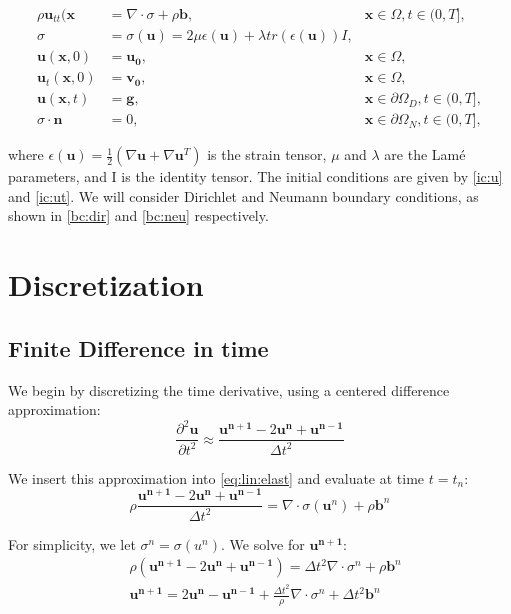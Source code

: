 \documentclass[twoside]{article}
\newcommand{\dutt}{\frac{\partial^2 \mathbf{u}}{\partial t^2}}
\newcommand{\dtt}{\Delta t^2}
\newcommand{\unp}{\mathbf{u^{n+1}}}
\newcommand{\un}{\mathbf{u^{n}}}
\newcommand{\unm}{\mathbf{u^{n-1}}}
\begin{document}
\begin{align}
\rho \mathbf{u}_{tt}(\mathbf{x} &= \nabla\cdot\sigma + \rho \mathbf{b},  &\mathbf{x}\in\Omega, t\in (0, T],     \label{eq:lin:elast}\\
\sigma &= \sigma(\mathbf{u}) = 2\mu\epsilon(\mathbf{u}) + \lambda tr(\epsilon(\mathbf{u}))I   ,  \label{sigma}\\
\mathbf{u}(\mathbf{x}, 0) &= \mathbf{u_0},  &\mathbf{x}\in\Omega,   \label{ic:u}\\
\mathbf{u}_t(\mathbf{x},0) &= \mathbf{v_0}, &\mathbf{x}\in\Omega,   \label{ic:ut}\\
\mathbf{u}(\mathbf{x}, t) &= \mathbf{g}, &\mathbf{x}\in\partial\Omega_D, t\in (0, T],          \label{bc:dir}\\
\sigma\cdot\mathbf{n} &= 0, &\mathbf{x}\in\partial\Omega_N, t\in (0, T],          \label{bc:neu}
\end{align}

where $\epsilon(\mathbf{u}) = \frac{1}{2}\left(\nabla \mathbf{u} + \nabla \mathbf{u}^T\right)$ is the strain tensor, $\mu$ and $\lambda$ are the Lam\'e parameters, and I is the identity tensor. The initial conditions are given by \eqref{ic:u} and \eqref{ic:ut}. We will consider Dirichlet and Neumann boundary conditions, as shown in \eqref{bc:dir} and \eqref{bc:neu} respectively. 


\section{Discretization}


\subsection{Finite Difference in time}

We begin by discretizing the time derivative, using a centered difference approximation:
\begin{equation}
\dutt  \approx \frac{\unp - 2 \un + \unm}{\dtt}
\end{equation}

We insert this approximation into \eqref{eq:lin:elast} and evaluate at time $t=t_n$:
\begin{equation}
\rho \frac{\unp - 2 \un + \unm}{\dtt} = \nabla\cdot\sigma(\mathbf{u}^n) + \rho \mathbf{b}^n
\end{equation}

For simplicity, we let $\sigma^n = \sigma(u^n)$. We solve for $\unp$:
\begin{align}
&\rho (\unp - 2 \un + \unm) = \dtt \nabla\cdot\sigma^n +  \rho \mathbf{b}^n  \nonumber\\
&\unp = 2 \un - \unm + \frac{\dtt}{\rho} \nabla\cdot\sigma^n + \dtt \mathbf{b}^n
\end{align}
\end{document}
